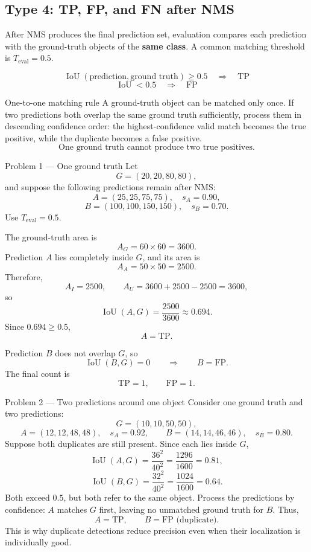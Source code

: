 \documentclass[11pt]{article}
\begin{document}
\subsection{Type 4: TP, FP, and FN after NMS}

After NMS produces the final prediction set, evaluation compares each prediction with the ground-truth objects of the \textbf{same class}. A common matching threshold is \(T_{\mathrm{eval}}=0.5\).

\begin{formulabox}
\[
\boxed{
\operatorname{IoU}(\text{prediction},\text{ground truth})\geq0.5
\quad\Longrightarrow\quad
\mathrm{TP}
}
\]
\[
\boxed{
\operatorname{IoU}<0.5
\quad\Longrightarrow\quad
\mathrm{FP}
}
\]
\end{formulabox}

\begin{prioritybox}{One-to-one matching rule}
A ground-truth object can be matched only once. If two predictions both overlap the same ground truth sufficiently, process them in descending confidence order: the highest-confidence valid match becomes the true positive, while the duplicate becomes a false positive.
\[
\boxed{\text{One ground truth cannot produce two true positives.}}
\]
\end{prioritybox}

\begin{practicebox}{Problem 1 --- One ground truth}
Let
\[
G=(20,20,80,80),
\]
and suppose the following predictions remain after NMS:
\[
A=(25,25,75,75),\quad s_A=0.90,
\]
\[
B=(100,100,150,150),\quad s_B=0.70.
\]
Use \(T_{\mathrm{eval}}=0.5\).

The ground-truth area is
\[
A_G=60\times60=3600.
\]
Prediction \(A\) lies completely inside \(G\), and its area is
\[
A_A=50\times50=2500.
\]
Therefore,
\[
A_I=2500,
\qquad
A_U=3600+2500-2500=3600,
\]
so
\[
\boxed{
\operatorname{IoU}(A,G)=\frac{2500}{3600}\approx0.694
}.
\]
Since \(0.694\geq0.5\),
\[
\boxed{A=\mathrm{TP}}.
\]

Prediction \(B\) does not overlap \(G\), so
\[
\operatorname{IoU}(B,G)=0
\qquad\Longrightarrow\qquad
\boxed{B=\mathrm{FP}}.
\]
The final count is
\[
\boxed{\mathrm{TP}=1,\qquad \mathrm{FP}=1}.
\]
\end{practicebox}

\begin{practicebox}{Problem 2 --- Two predictions around one object}
Consider one ground truth and two predictions:
\[
G=(10,10,50,50),
\]
\[
A=(12,12,48,48),\quad s_A=0.92,
\qquad
B=(14,14,46,46),\quad s_B=0.80.
\]
Suppose both duplicates are still present. Since each lies inside \(G\),
\[
\operatorname{IoU}(A,G)=\frac{36^2}{40^2}
=\frac{1296}{1600}=0.81,
\]
\[
\operatorname{IoU}(B,G)=\frac{32^2}{40^2}
=\frac{1024}{1600}=0.64.
\]
Both exceed \(0.5\), but both refer to the same object. Process the predictions by confidence: \(A\) matches \(G\) first, leaving no unmatched ground truth for \(B\). Thus,
\[
\boxed{A=\mathrm{TP}},
\qquad
\boxed{B=\mathrm{FP}\text{ (duplicate)}}.
\]
This is why duplicate detections reduce precision even when their localization is individually good.
\end{practicebox}
\end{document}
